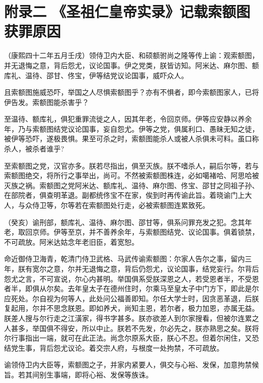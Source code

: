 \chapter*{附录二 《圣祖仁皇帝实录》记载索额图获罪原因}

（康熙四十二年五月壬戌）领侍卫内大臣、和硕额驸尚之隆等传上谕：观索额图，并无退悔之意，背后怨尤，议论国事。伊之党类，朕皆访知。阿米达、麻尔图、额库礼、温待、邵甘、佟宝，伊等结党议论国事，威吓众人。



且索额图施威恐吓，举国之人尽惧索额图乎？亦有不惧者，即今索额图家人，已将伊告发。索额图能杀害乎？



至温待、额库礼，俱犯重罪流徙之人，因其年老，令回京师。伊等应安静以养余年，乃与索额图结党议论国事，妄自怨尤。伊等之党，俱属利口、愚昧无知之徒，被伊等恐吓，遂极畏惧。果至可杀之时，索额图能杀人或被人杀俱未可料。虽口称杀人，被杀者谁乎?



至索额图之党，汉官亦多。朕若尽指出，俱至灭族。朕不嗜杀人，嗣后尔等，若与索额图绝交，将所行之事举出，尚可。不然被索额图株连，必如噶褚哈、阿思哈被灭族之祸。索额图之党阿米达、额库礼、温待、麻尔图、佟宝、邵甘之同祖子孙、在部院者，俱查明革退。副都统佟宝不在家，俟到时再传谕此旨。着晓谕门上大人，与众侍卫等，尔等若在索额图处行走，必被索额图连累致死。



（癸亥）谕刑部，额库礼、温待、麻尔图、邵甘等，俱系问罪充发之犯。念其年老，取回京师。伊等至京，并不善养余年，与索额图结党、议论国事。俱着锁禁，不可疏放。阿米达姑念年老旧臣，着宽恕。



命近御侍卫海青，乾清门侍卫武格、马武传谕索额图：尔家人告尔之事，留内三年，朕有宽尔之意，尔并无退悔之意，背后仍怨尤，议论国事，结党妄行。尔背后怨尤之言，不可宣说，尔心内甚明。举国俱系受朕深恩之人，若受恩者半，不受恩者半，即俱从尔矣。去年皇太子在德州住时，尔乘马至皇太子中门方下，即此是尔应死处。尔自视为何等人，此处问公福善即知。尔任大学士时，因贪恶革退，后朕复起用，尔并不思念朕恩。即如养犬，尚知主恩，若尔者，极力加恩，亦属无益。朕差人搜与尔行走之江潢家，得书字甚多。朕亦欲差人到尔家搜看，但被尔连累之人甚多，举国俱不得安，所以中止。朕若不先发，尔必先之，朕亦熟思之矣。朕将尔行事指出一端，就可在此正法。尚念尔原系大臣，朕心不忍。但着尔闲住，又恐结党生事，背后怨尤议论。着交宗人府，与根度一处拘禁，不可疏放。



谕领侍卫内大臣等，索额图之子，并家内紧要人，俱交与心裕、发保，加意拘禁候旨。若其间别生事端，即将心裕、发保等族诛。

